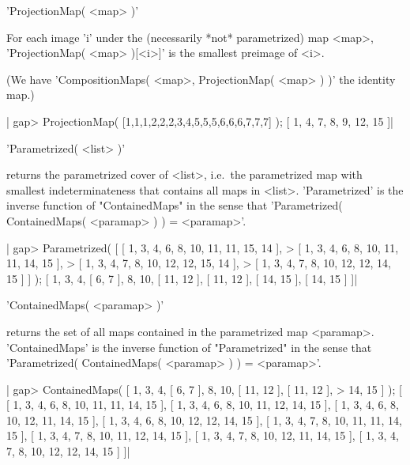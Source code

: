 
'ProjectionMap( <map> )'

For each image 'i' under the (necessarily *not* parametrized) map <map>,
'ProjectionMap( <map> )[<i>]' is the smallest preimage of <i>.

(We have 'CompositionMaps( <map>, ProjectionMap( <map> ) )' the identity map.)

|    gap> ProjectionMap( [1,1,1,2,2,2,3,4,5,5,5,6,6,6,7,7,7] );
    [ 1, 4, 7, 8, 9, 12, 15 ]|


'Parametrized( <list> )'

returns the parametrized cover of <list>, i.e.\ the parametrized map with
smallest indeterminateness that contains all maps in <list>.
'Parametrized' is the inverse function of "ContainedMaps" in the sense that
'Parametrized( ContainedMaps( <paramap> ) ) = <paramap>'.

|    gap> Parametrized( [ [ 1, 3, 4, 6, 8, 10, 11, 11, 15, 14 ],
    >                    [ 1, 3, 4, 6, 8, 10, 11, 11, 14, 15 ],
    >                    [ 1, 3, 4, 7, 8, 10, 12, 12, 15, 14 ], 
    >                    [ 1, 3, 4, 7, 8, 10, 12, 12, 14, 15 ] ] );
    [ 1, 3, 4, [ 6, 7 ], 8, 10, [ 11, 12 ], [ 11, 12 ], [ 14, 15 ],
      [ 14, 15 ] ]|


'ContainedMaps( <paramap> )'

returns the set of all maps contained in the parametrized map <paramap>.
'ContainedMaps' is the inverse function of "Parametrized" in the sense that
'Parametrized( ContainedMaps( <paramap> ) ) = <paramap>'.

|    gap> ContainedMaps( [ 1, 3, 4, [ 6, 7 ], 8, 10, [ 11, 12 ], [ 11, 12 ],
    > 14, 15 ] );
    [ [ 1, 3, 4, 6, 8, 10, 11, 11, 14, 15 ],
      [ 1, 3, 4, 6, 8, 10, 11, 12, 14, 15 ],
      [ 1, 3, 4, 6, 8, 10, 12, 11, 14, 15 ], 
      [ 1, 3, 4, 6, 8, 10, 12, 12, 14, 15 ],
      [ 1, 3, 4, 7, 8, 10, 11, 11, 14, 15 ],
      [ 1, 3, 4, 7, 8, 10, 11, 12, 14, 15 ], 
      [ 1, 3, 4, 7, 8, 10, 12, 11, 14, 15 ],
      [ 1, 3, 4, 7, 8, 10, 12, 12, 14, 15 ] ]|


